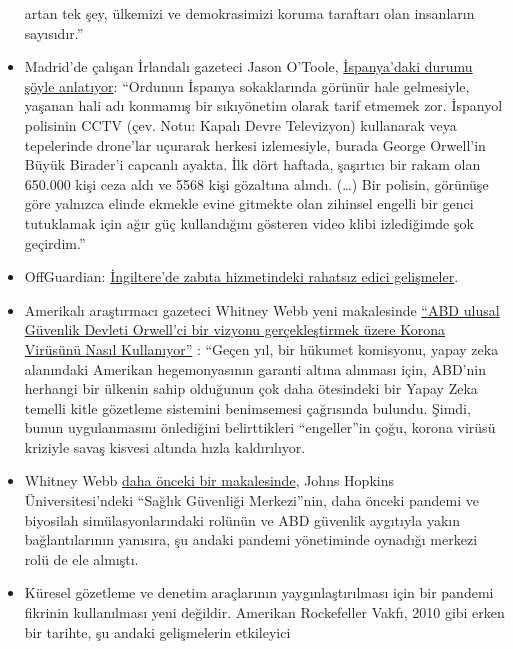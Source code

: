 \begin{itemize}
  artan tek şey, ülkemizi ve demokrasimizi koruma taraftarı olan
  insanların sayısıdır.''
\item
  Madrid'de çalışan İrlandalı gazeteci Jason O'Toole,
  \href{https://www.rt.com/op-ed/486350-spain-tough-rules-covid-19-lockdown/}{İspanya'daki
  durumu şöyle anlatıyor}: ``Ordunun İspanya sokaklarında görünür hale
  gelmesiyle, yaşanan hali adı konmamış bir sıkıyönetim olarak tarif
  etmemek zor. İspanyol polisinin CCTV (çev. Notu: Kapalı Devre
  Televizyon) kullanarak veya tepelerinde drone'lar uçurarak herkesi
  izlemesiyle, burada George Orwell'in Büyük Birader'i capcanlı ayakta.
  İlk dört haftada, şaşırtıcı bir rakam olan 650.000 kişi ceza aldı ve
  5568 kişi gözaltına alındı. (\ldots{}) Bir polisin, görünüşe göre
  yalnızca elinde ekmekle evine gitmekte olan zihinsel engelli bir genci
  tutuklamak için ağır güç kullandığını gösteren video klibi izlediğimde
  şok geçirdim.''
\item
  OffGuardian:
  \href{https://off-guardian.org/2020/04/18/the-disturbing-developments-in-uk-policing/}{İngiltere'de
  zabıta hizmetindeki rahatsız edici gelişmeler}.
\item
  Amerikalı araştırmacı gazeteci Whitney Webb yeni makalesinde
  \href{https://www.thelastamericanvagabond.com/top-news/techno-tyranny-how-us-national-security-state-using-coronavirus-fulfill-orwellian-vision/}{``ABD
  ulusal Güvenlik Devleti Orwell'ci bir vizyonu gerçekleştirmek üzere
  Korona Virüsünü Nasıl Kullanıyor''} : ``Geçen yıl, bir hükumet
  komisyonu, yapay zeka alanındaki Amerikan hegemonyasının garanti
  altına alınması için, ABD'nin herhangi bir ülkenin sahip olduğunun çok
  daha ötesindeki bir Yapay Zeka temelli kitle gözetleme sistemini
  benimsemesi çağrısında bulundu. Şimdi, bunun uygulanmasını önlediğini
  belirttikleri ``engeller''in çoğu, korona virüsü kriziyle savaş
  kisvesi altında hızla kaldırılıyor.
\item
  Whitney Webb
  \href{https://www.thelastamericanvagabond.com/top-news/all-roads-lead-dark-winter/}{daha
  önceki bir makalesinde}, Johns Hopkins Üniversitesi'ndeki ``Sağlık
  Güvenliği Merkezi''nin, daha önceki pandemi ve biyosilah
  simülasyonlarındaki rolünün ve ABD güvenlik aygıtıyla yakın
  bağlantılarının yanısıra, şu andaki pandemi yönetiminde oynadığı
  merkezi rolü de ele almıştı.
\item
  Küresel gözetleme ve denetim araçlarının yaygınlaştırılması için bir
  pandemi fikrinin kullanılması yeni değildir. Amerikan Rockefeller
  Vakfı, 2010 gibi erken bir tarihte, şu andaki gelişmelerin etkileyici

\end{itemize}
